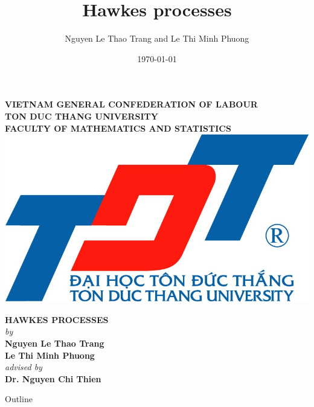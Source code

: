 \documentclass[11pt]{beamer}
\title{Hawkes processes}
\author{Nguyen Le Thao Trang and Le Thi Minh Phuong}
\date{\today}
\theoremstyle{example}
\begin{document}
\begin{frame}
	\begin{center}
		\small{\textbf{VIETNAM GENERAL CONFEDERATION OF LABOUR}} \\
		\small{\textbf{TON DUC THANG UNIVERSITY}}\\
		\small{\textbf{FACULTY OF MATHEMATICS AND STATISTICS}} \\
		
		\vspace*{0.2cm}
		\includegraphics[scale=0.08]{TDT_logo.jpg}
		
		\vspace*{0.2cm}
		\huge{\textbf{HAWKES PROCESSES}}\\
		
		\vspace*{0.5cm}
			\Large{\textit{by}} \\
		\Large{\textbf{Nguyen Le Thao Trang}} \\
		\Large{\textbf{Le Thi Minh Phuong}} \\
		\Large{\textit{advised by}} \\
		\Large{\textbf{Dr. Nguyen Chi Thien}} \\
		
		\vspace*{0.5cm}
		\small
	\end{center}	
\end{frame}

\begin{frame}{Outline}
	\tableofcontents
\end{frame}
\end{document}
